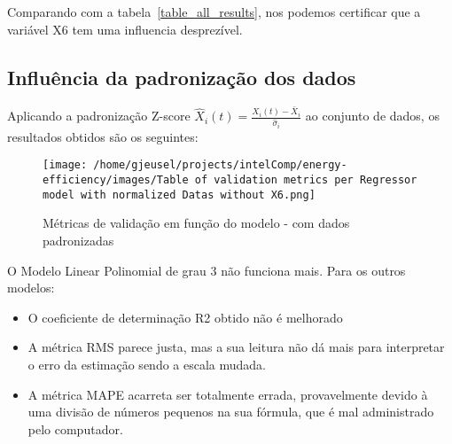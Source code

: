 \documentclass[paper=a4, fontsize=11pt]{article} %
\numberwithin{equation}{section} %
\numberwithin{figure}{section} %
\numberwithin{table}{section} %
\begin{document}
Comparando com a tabela~\ref{table_all_results}, nos podemos certificar que a variável X6 tem uma influencia desprezível.

\subsection{Influência da padronização dos dados}

Aplicando a padronização Z-score $\hat{X}_{i}(t) = \frac{X_{i}(t) - \bar{X}_{i}}{\hat{\sigma}_{i}}$ ao conjunto de dados,
os resultados obtidos são os seguintes:

\begin{figure}[H] %
\begin{center}
\texttt{[image: /home/gjeusel/projects/intelComp/energy-efficiency/images/Table of validation metrics per Regressor model with normalized Datas without X6.png]}
\end{center}
\caption{Métricas de validação em função do modelo - com dados padronizadas}
\label{table_all_results_normalized}
\end{figure}

O Modelo Linear Polinomial de grau 3 não funciona mais.\newline
Para os outros modelos:
\begin{itemize}
\item O coeficiente de determinação R2 obtido não é melhorado
\item A métrica RMS parece justa, mas a sua leitura não dá mais para interpretar o erro da estimação sendo a escala mudada.
\item A métrica MAPE acarreta ser totalmente errada, provavelmente devido à uma divisão de números pequenos na sua fórmula, que é mal administrado pelo computador.
\end{itemize}

\newpage
\listoftables
\listoffigures

\newpage
\end{document}
